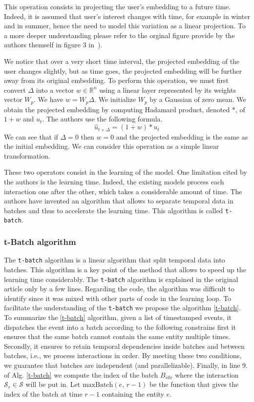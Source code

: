 This operation consists in projecting the user's embedding to a future time. Indeed, it is assumed that user's interest changes with time, for example in winter and in summer, hence the need to model this variation as a linear projection. To a more deeper understanding please refer to the orginal figure provide by the authors themself in figure 3 in~\cite{kumar2019predicting}).

We notice that over a very short time interval, the projected embedding of the user changes slightly, but as time goes, the projected embedding will be further away from its original embedding. To perform this operation, we must first convert $\Delta$ into a vector $w \in \mathbb{R}^n$ using a linear layer represented by its weights vector $W_p$. We have $w = W_p \Delta$. We initialize $W_p$ by a Gaussian of zero mean. We obtain the projected embedding by computing Hadamard product, denoted $*$, of $1+w$ and $u_t$. The authors use the following formula.
$$
\widehat u_{t+\Delta} = (1+w) * u_t
$$
We can see that if $\Delta = 0$ then $w=0$ and the projected embedding is the same as the initial embedding. We can consider this operation as a simple linear transformation.

These two operators consist in the learning of the model. One limitation cited by the authors is the learning time. Indeed, the existing models process each interaction one after the other, which takes a considerable amount of time. The authors have invented an algorithm that allows to separate temporal data in batches and thus to accelerate the learning time. This algorithm is called \texttt{t-batch}.

\subsubsection{t-Batch algorithm}

The \texttt{t-batch} algorithm is a linear algorithm that split temporal data into batches. This algorithm is a key point of the method that allows to speed up the learning time considerably. The \texttt{t-batch} algorithm is explained in the original article only by a few lines. Regarding the code, the algorithm was difficult to identify since it was mixed with other parts of code in the learning loop. To facilitate the understanding of the \texttt{t-batch} we propose the algorithm \ref{t-batch}. To summarize the \ref{t-batch} algorithm, given a list of timestamped events, it dispatches the event into a batch according to the following constrains first it ensures that the same batch cannot contain the same entity multiple times. Secondly, it ensures to retain temporal dependencies inside batches and between batches, i.e., we process interactions in order. By meeting these two conditions, we guarantee that batches are independent (and parallelizable). Finally, in line 9. of Alg. \ref{t-batch} we compute the index of the batch $B_{idx}$ where the interaction $\mathcal{S}_r \in \mathcal{S}$ will be put in. Let $\text{maxBatch}(e, \,r-1)$ be the function that gives the index of the batch at time $r-1$ containing the entity $e$. 

